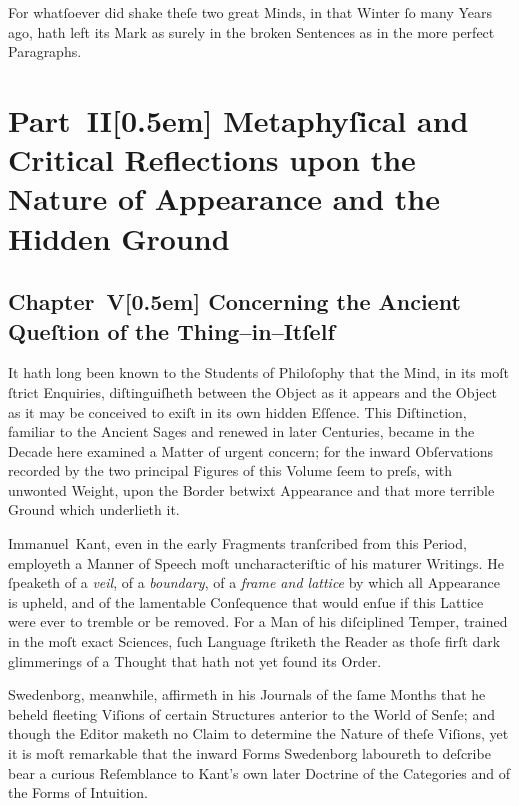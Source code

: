 \documentclass[12pt]{book}
\begin{document}
For whatſoever did shake theſe two great Minds, in that Winter ſo many Years ago, hath left its Mark as surely in the broken Sentences as in the more perfect Paragraphs.

\newpage

\part*{Part~II[0.5em]
Metaphyſical and Critical Reflections upon the Nature of Appearance and the Hidden Ground}



\chapter*{Chapter~V[0.5em]
Concerning the Ancient Queſtion of the Thing–in–Itſelf}


It hath long been known to the Students of Philoſophy that the Mind, in its moſt ſtrict Enquiries, diſtinguiſheth between the Object as it appears and the Object as it may be conceived to exiſt in its own hidden Eſſence. This Diſtinction, familiar to the Ancient Sages and renewed in later Centuries, became in the Decade here examined a Matter of urgent concern; for the inward Obſervations recorded by the two principal Figures of this Volume ſeem to preſs, with unwonted Weight, upon the Border betwixt Appearance and that more terrible Ground which underlieth it.

Immanuel~Kant, even in the early Fragments tranſcribed from this Period, employeth a Manner of Speech moſt uncharacteriſtic of his maturer Writings. He ſpeaketh of a \textit{veil}, of a \textit{boundary}, of a \textit{frame and lattice} by which all Appearance is upheld, and of the lamentable Conſequence that would enſue if this Lattice were ever to tremble or be removed. For a Man of his diſciplined Temper, trained in the moſt exact Sciences, ſuch Language ſtriketh the Reader as thoſe firſt dark glimmerings of a Thought that hath not yet found its Order.

Swedenborg, meanwhile, affirmeth in his Journals of the ſame Months that he beheld fleeting Viſions of certain Structures anterior to the World of Senſe; and though the Editor maketh no Claim to determine the Nature of theſe Viſions, yet it is moſt remarkable that the inward Forms Swedenborg laboureth to deſcribe bear a curious Reſemblance to Kant’s own later Doctrine of the Categories and of the Forms of Intuition.
\end{document}
